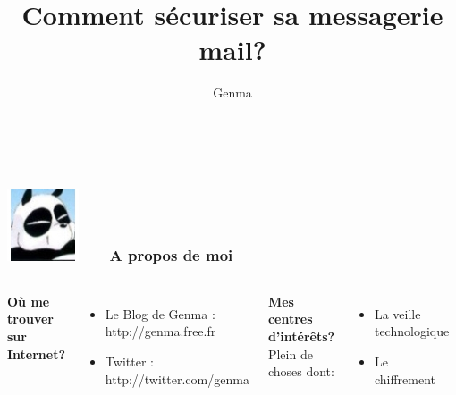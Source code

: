\documentclass{beamer}
\title[Comment sécuriser sa messagerie mail?]{Comment sécuriser sa messagerie mail?}
\author{Genma}
\begin{document}
\begin{frame}
	\titlepage
	\vfill
	\begin{center}
		\\[2.5ex]
		{\tiny\CcNote{\CcLongnameByNcSa}}
		\vspace*{-2.5ex}
	\end{center}
\end{frame}

\begin{frame}
\frametitle{\includegraphics[scale=0.4]{./Genma.jpg} \ \ \  A propos de moi  }
\begin{columns}[c] 

\textbf{Où me trouver sur Internet?}
\begin{itemize}
\item Le Blog de Genma : http://genma.free.fr
\item Twitter : http://twitter.com/genma
\end{itemize}

\textbf{Mes centres d'intérêts?}
\\ Plein de choses dont:
\begin{itemize}
\item La veille technologique
\item Le chiffrement
\end{itemize}

\includegraphics[width=5cm,height=5cm]{blog.png} 

\end{columns}
\end{frame}

\end{document}
